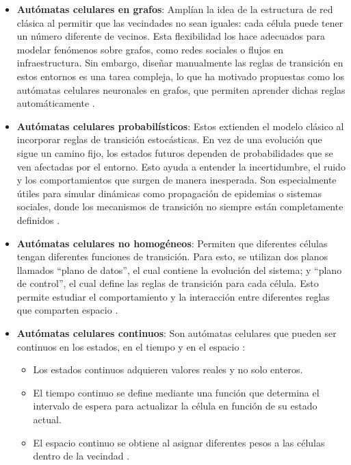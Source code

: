 \begin{itemize}
	
	\item \textbf{Autómatas celulares en grafos}: Amplían la idea de la estructura de red clásica al permitir que las vecindades no sean iguales: cada célula puede tener un número diferente de vecinos. Esta flexibilidad los hace adecuados para modelar fenómenos sobre grafos, como redes sociales o flujos en infraestructura. Sin embargo, diseñar manualmente las reglas de transición en estos entornos es una tarea compleja, lo que ha motivado propuestas como los autómatas celulares neuronales en grafos, que permiten aprender dichas reglas automáticamente \cite{neuripsGCA}.
	
	\item \textbf{Autómatas celulares probabilísticos}: Estos extienden el modelo clásico al incorporar reglas de transición estocásticas. En vez de una evolución que sigue un camino fijo, los estados futuros dependen de probabilidades que se ven afectadas por el entorno. Esto ayuda a entender la incertidumbre, el ruido y los comportamientos que surgen de manera inesperada. Son especialmente útiles para simular dinámicas como propagación de epidemias o sistemas sociales, donde los mecanismos de transición no siempre están completamente definidos \cite{gacsPCA}.
	
	\item \textbf{Autómatas celulares no homogéneos}: Permiten que diferentes células tengan diferentes funciones de transición. Para esto, se utilizan dos planos llamados ``plano de datos'', el cual contiene la evolución del sistema; y ``plano de control'', el cual define las reglas de transición para cada célula. Esto permite estudiar el comportamiento y la interacción entre diferentes reglas que comparten espacio \cite{hartmanIHCA}.
	
	\item \textbf{Autómatas celulares continuos}: Son autómatas celulares que pueden ser continuos en los estados, en el tiempo y en el espacio \cite{nks}:
	
	\begin{itemize}
		\item Los estados continuos adquieren valores reales y no solo enteros.
		
		\item El tiempo continuo se define mediante una función que determina el intervalo de espera para actualizar la célula en función de su estado actual.
		
		\item El espacio continuo se obtiene al asignar diferentes pesos a las células dentro de la vecindad \cite{beckerCCA}.
	\end{itemize}
\end{itemize}

